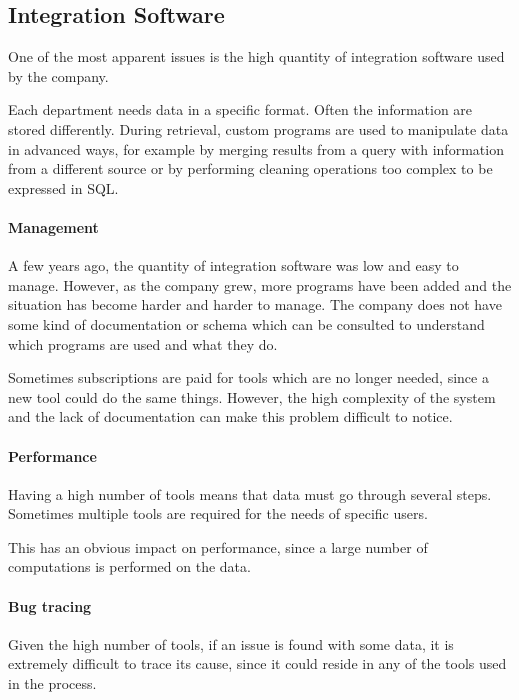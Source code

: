 \subsection{Integration Software}
    One of the most apparent issues is the high quantity of integration software used by the company.
    
    Each department needs data in a specific format.
    Often the information are stored differently.
    During retrieval, custom programs are used to manipulate data in advanced ways, for example by merging results from a query with information from a different source or by performing cleaning operations too complex to be expressed in SQL.

    \paragraph{Management}
        A few years ago, the quantity of integration software was low and easy to manage.
        However, as the company grew, more programs have been added and the situation has become harder and harder to manage.
        The company does not have some kind of documentation or schema which can be consulted to understand which programs are used and what they do.
        
        Sometimes subscriptions are paid for tools which are no longer needed, since a new tool could do the same things.
        However, the high complexity of the system and the lack of documentation can make this problem difficult to notice.
        
    \paragraph{Performance}
        Having a high number of tools means that data must go through several steps.
        Sometimes multiple tools are required for the needs of specific users.
        
        This has an obvious impact on performance, since a large number of computations is performed on the data.
        
    \paragraph{Bug tracing}
        Given the high number of tools, if an issue is found with some data, it is extremely difficult to trace its cause, since it could reside in any of the tools used in the process.
        
